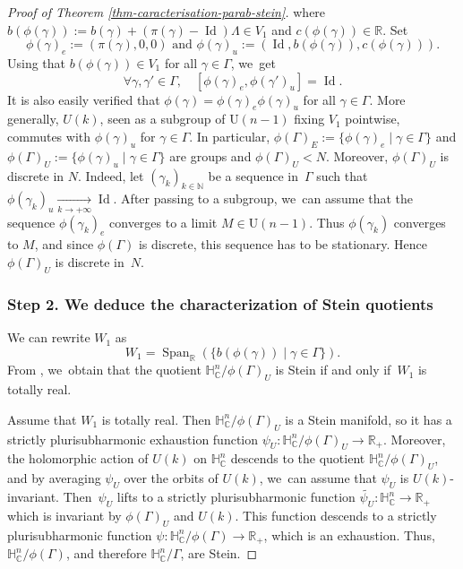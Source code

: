 \documentclass[JEP,XML,SOM,Unicode,NoEqCountersInSection,published]{cedram}
\theoremstyle{definition}
\newcommand{\C}{\mathbb{C}}
\newcommand{\R}{\mathbb{R}}
\newcommand{\N}{\mathbb{N}}
\newcommand{\HNC}{\mathbb{H}^{n}_{\C}}
\DeclareMathOperator{\Id}{Id}
\def\C{\mathbb{C}}
\newcommand{\HNC}{\mathbb{H}^{n}_{\C}}
\begin{document}
\begin{proof}[Proof of Theorem \ref{thm-caracterisation-parab-stein}]
where $b(\phi(\gamma)):= b(\gamma) + (\pi(\gamma)-\Id)\Lambda \in V_1$ and $c(\phi(\gamma)) \in \R$. Set
\begin{equation*}
\phi(\gamma)_e:= (\pi(\gamma),0,0) \text{ and }
\phi(\gamma)_u:= (\Id,b(\phi(\gamma)),c(\phi(\gamma))).
\end{equation*}
Using that $b(\phi(\gamma))\in V_1$ for all $\gamma\in \Gamma$, we~get
\begin{equation*}
\forall \gamma,\gamma'\in \Gamma,\quad [\phi(\gamma)_e,\phi(\gamma')_u] = \Id.
\end{equation*}It is also easily verified that $\phi(\gamma) = \phi(\gamma)_e\phi(\gamma)_u$ for all $\gamma \in \Gamma$.
More generally, $U(k)$, seen as a subgroup of $\mathrm{U}(n-1)$ fixing $V_1$ pointwise, commutes with $\phi(\gamma)_u$ for $\gamma\in \Gamma$. In particular, $\phi(\Gamma)_E:= \{\phi(\gamma)_e \mid \gamma \in \Gamma\}$ and $\phi(\Gamma)_U:= \{\phi(\gamma)_u \mid \gamma \in \Gamma\}$ are groups and $\phi(\Gamma)_U<N$. Moreover, $\phi(\Gamma)_U$ is discrete in $N$. Indeed, let $(\gamma_k)_{k\in \N}$ be a sequence in~$\Gamma$ such that $\phi(\gamma_k)_u \underset{k\to +\infty}{\to} \Id$. After passing to a subgroup, we~can assume that the sequence $\phi(\gamma_k)_e$ converges to a limit $M\in \mathrm{U}(n-1)$. Thus $\phi(\gamma_k)$ converges to $M$, and since $\phi(\Gamma)$ is discrete, this sequence has to be stationary. Hence $\phi(\Gamma)_U$ is discrete in~$N$.

\subsubsection*{Step 2. We deduce the characterization of Stein quotients}

We can rewrite $W_1$ as
\begin{equation*}
W_1 = \operatorname{Span}_{\R}(\{b(\phi(\gamma)) \mid \gamma \in \Gamma\}).
\end{equation*}
From \cite[Th.\,1.4]{miebachQuotientsBoundedHomogeneous2024}, we~obtain that the quotient $\HNC/\phi(\Gamma)_U$ is Stein if and only if~$W_1$ is totally real.

Assume that $W_1$ is totally real. Then $\HNC/\phi(\Gamma)_U$ is a Stein manifold, so it has a strictly plurisubharmonic exhaustion function $\psi_U:\HNC/\phi(\Gamma)_U\to \R_+$. Moreover, the holomorphic action of $U(k)$ on $\HNC$ descends to the quotient $\HNC/\phi(\Gamma)_U$, and by averaging $\psi_U$ over the orbits of $U(k)$, we~can assume that $\psi_U$ is $U(k)$-invariant. Then~$\psi_U$ lifts to a strictly plurisubharmonic function $\widetilde{\psi_U}:\HNC\to \R_+$ which is invariant by $\phi(\Gamma)_U$ and $U(k)$. This function descends to a strictly plurisubharmonic function $\psi:\HNC/\phi(\Gamma)\to \R_+$, which is an exhaustion. Thus, $\HNC/\phi(\Gamma)$, and therefore $\HNC/\Gamma$, are Stein.


\end{proof}
\end{document}
